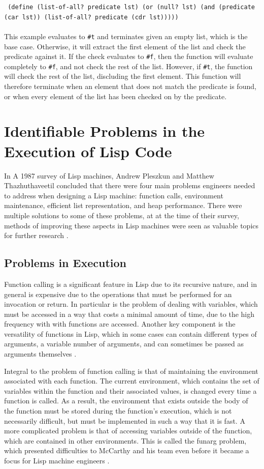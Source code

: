 \documentclass[journal]{IEEEtran}
\begin{document}
\texttt{
	(define (list-of-all? predicate lst)
			(or 
				(null? lst)
				(and (predicate (car lst))
					 (list-of-all? predicate (cdr lst)))))
}\\\\This example evaluates to \texttt{\#t} and terminates given an empty list, which is the base case. Otherwise, it will extract the first element of the list and check the predicate against it. If the check evaluates to \texttt{\#f}, then the function will evaluate completely to \texttt{\#f}, and not check the rest of the list. However, if \texttt{\#t}, the function will check the rest of the list, discluding the first element. This function will therefore terminate when an element that does not match the predicate is found, or when every element of the list has been checked on by the predicate.

\section{Identifiable Problems in the Execution of Lisp Code}
In A 1987 survey of Lisp machines, Andrew Pleszkun and Matthew Thazhuthaveetil concluded that there were four main problems engineers needed to address when designing a Lisp machine: function calls, environment maintenance, efficient list representation, and heap performance. There were multiple solutions to some of these problems, at at the time of their survey, methods of improving these aspects in Lisp machines were seen as valuable topics for further research \cite{pt}.

\subsection{Problems in Execution}
Function calling is a significant feature in Lisp due to its recursive nature, and in general is expensive due to the operations that must be performed for an invocation or return. In particular is the problem of dealing with variables, which must be accessed in a way that costs a minimal amount of time, due to the high frequency with with functions are accessed. Another key component is the versatility of functions in Lisp, which in some cases can contain different types of arguments, a variable number of arguments, and can sometimes be passed as arguments themselves \cite{pt}.

Integral to the problem of function calling is that of maintaining the environment associated with each function. The current environment, which contains the set of variables within the function and their associated values, is changed every time a function is called. As a result, the environment that exists outside the body of the function must be stored during the function's execution, which is not necessarily difficult, but must be implemented in such a way that it is fast. A more complicated problem is that of accessing variables outside of the function, which are contained in other environments. This is called the funarg problem, which presented difficulties to McCarthy and his team even before it became a focus for Lisp machine engineers \cite{stoyan, pt}.
\end{document}
